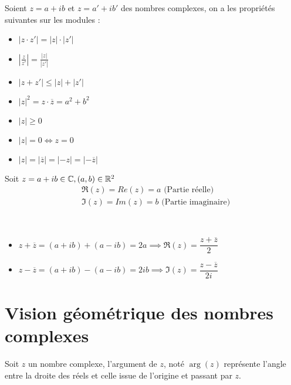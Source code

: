 \begin{graybox}
\begin{proposition}
    Soient $z = a + ib$ et $z = a' + ib'$ des nombres complexes, on a les propriétés suivantes sur les modules :
    \begin{itemize}
        \item $|z \cdot z'| = |z| \cdot |z'|$
        \item $\left| \frac{z}{z'} \right| = \frac{|z|}{|z'|}$
        \item $|z + z'| \leq |z| + |z'|$
        \item $|z|^2 = z \cdot \overline{z} = a^2 + b^2$
        \item $|z| \geq 0$
        \item $|z| = 0 \iff z = 0$
        \item $|z| = |\overline{z}| = |-z| = |-\overline{z}|$
    \end{itemize}
\end{proposition}
\end{graybox}

\begin{graybox}
\begin{definition}
    Soit $z = a + ib \in \mathbb{C}, (a, b) \in \mathbb{R}^2$
    \begin{align*}
        &\Re(z) = Re(z) = a \text{ (Partie réelle)} \\
        &\Im(z) = Im(z) = b \text{ (Partie imaginaire)}
    \end{align*}
\end{definition}
\end{graybox}


\begin{graybox}
\begin{proposition}~
    \begin{itemize}
        \item $z + \overline{z} = (a + ib) + (a - ib) = 2a \implies \Re(z) = \dfrac{z + \overline{z}}{2}$
        \item $z - \overline{z} = (a + ib) - (a - ib) = 2ib \implies \Im(z) = \dfrac{z - \overline{z}}{2i}$
    \end{itemize}
\end{proposition}
\end{graybox}
\section{Vision géométrique des nombres complexes}
\begin{graybox}
\begin{definition}
    Soit $z$ un nombre complexe, l'argument de $z$, noté $\arg{(z)}$ représente l'angle entre la droite des réels et celle issue de l'origine et passant par $z$.
\end{definition}
\end{graybox}


